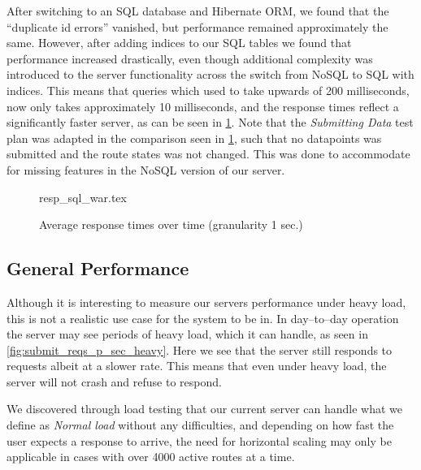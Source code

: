 After switching to an SQL database and Hibernate ORM, we found that the \enquote{duplicate id errors} vanished, but performance remained approximately the same.
However, after adding indices to our SQL tables we found that performance increased drastically, even though additional complexity was introduced to the server functionality across the switch from NoSQL to SQL with indices.
This means that queries which used to take upwards of 200 milliseconds, now only takes approximately 10 milliseconds, and the response times reflect a significantly faster server, as can be seen in \cref{fig:nosql_vs_sql}.
Note that the \textit{Submitting Data} test plan was adapted in the comparison seen in \cref{fig:nosql_vs_sql}, such that no datapoints was submitted and the route states was not changed.
This was done to accommodate for missing features in the NoSQL version of our server.

\begin{figure}[!htb]
    \centering
    \footnotesize
    {resp_sql_war.tex}
    \caption{Average response times over time (granularity 1 sec.)}\label{fig:nosql_vs_sql}
\end{figure}

\subsection{General Performance}
Although it is interesting to measure our servers performance under heavy load, this is not a realistic use case for the system to be in.
In day--to--day operation the server may see periods of heavy load, which it can handle, as seen in \cref{fig:submit_reqs_p_sec_heavy}. %
Here we see that the server still responds to requests albeit at a slower rate.
This means that even under heavy load, the server will not crash and refuse to respond.

We discovered through load testing that our current server can handle what we define as \textit{Normal load} without any difficulties, and depending on how fast the user expects a response to arrive, the need for horizontal scaling may only be applicable in cases with over 4000 active routes at a time.
